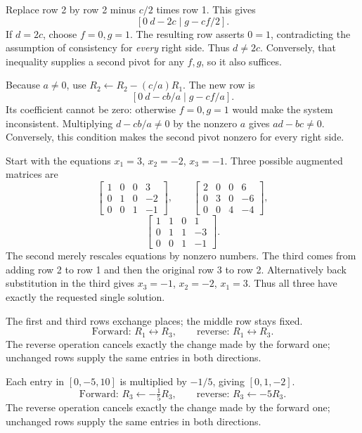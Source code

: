 Replace row 2 by row 2 minus $c/2$ times row 1. This gives
\[
 [0\ d-2c\mid g-cf/2].
\]
If $d=2c$, choose $f=0,g=1$. The resulting row asserts $0=1$,
contradicting the assumption of consistency for \emph{every} right side.
Thus $d\ne2c$. Conversely, that inequality supplies a second pivot
for any $f,g$, so it also suffices.

Because $a\ne0$, use $R_2\leftarrow R_2-(c/a)R_1$.
The new row is
\[
 [0\ d-cb/a\mid g-cf/a].
\]
Its coefficient cannot be zero: otherwise $f=0,g=1$ would make the
system inconsistent. Multiplying $d-cb/a\ne0$ by the nonzero $a$
gives $ad-bc\ne0$. Conversely, this condition makes the second pivot
nonzero for every right side.

Start with the equations $x_1=3$, $x_2=-2$, $x_3=-1$.
Three possible augmented matrices are
\[
\left[\begin{array}{rrr|r}1&0&0&3\\0&1&0&-2\\0&0&1&-1\end{array}\right],\qquad
\left[\begin{array}{rrr|r}2&0&0&6\\0&3&0&-6\\0&0&4&-4\end{array}\right],
\]
\[
\left[\begin{array}{rrr|r}1&1&0&1\\0&1&1&-3\\0&0&1&-1\end{array}\right].
\]
The second merely rescales equations by nonzero numbers. The third
comes from adding row 2 to row 1 and then the original row 3 to row 2.
Alternatively back substitution in the third gives $x_3=-1$, $x_2=-2$,
$x_1=3$. Thus all three have exactly the requested single solution.

The first and third rows exchange places; the middle row stays fixed.
\[\text{Forward: }R_1\leftrightarrow R_3,\qquad\text{reverse: }R_1\leftrightarrow R_3.\]
The reverse operation cancels exactly the change made by the forward one; unchanged rows supply the same entries in both directions.

Each entry in $[0,-5,10]$ is multiplied by $-1/5$, giving $[0,1,-2]$.
\[\text{Forward: }R_3\leftarrow-\tfrac15R_3,\qquad\text{reverse: }R_3\leftarrow-5R_3.\]
The reverse operation cancels exactly the change made by the forward one; unchanged rows supply the same entries in both directions.

